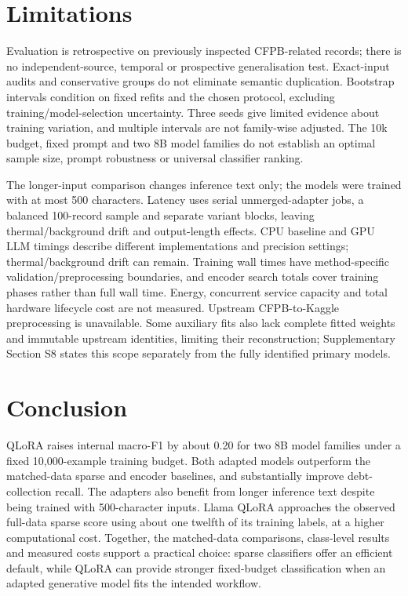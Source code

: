 \documentclass{elektr}
\begin{document}
\section{Limitations}
\label{sec:limitations}
Evaluation is retrospective on previously inspected CFPB-related records; there is no independent-source, temporal or prospective generalisation test. Exact-input audits and conservative groups do not eliminate semantic duplication. Bootstrap intervals condition on fixed refits and the chosen protocol, excluding training/model-selection uncertainty. Three seeds give limited evidence about training variation, and multiple intervals are not family-wise adjusted. The 10k budget, fixed prompt and two 8B model families do not establish an optimal sample size, prompt robustness or universal classifier ranking.

The longer-input comparison changes inference text only; the models were trained with at most 500 characters. Latency uses serial unmerged-adapter jobs, a balanced 100-record sample and separate variant blocks, leaving thermal/background drift and output-length effects. CPU baseline and GPU LLM timings describe different implementations and precision settings; thermal/background drift can remain. Training wall times have method-specific validation/preprocessing boundaries, and encoder search totals cover training phases rather than full wall time. Energy, concurrent service capacity and total hardware lifecycle cost are not measured. Upstream CFPB-to-Kaggle preprocessing is unavailable. Some auxiliary fits also lack complete fitted weights and immutable upstream identities, limiting their reconstruction; Supplementary Section S8 states this scope separately from the fully identified primary models.

\section{Conclusion}
\label{sec:conclusion}
QLoRA raises internal macro-F1 by about 0.20 for two 8B model families under a fixed 10,000-example training budget. Both adapted models outperform the matched-data sparse and encoder baselines, and substantially improve debt-collection recall. The adapters also benefit from longer inference text despite being trained with 500-character inputs. Llama QLoRA approaches the observed full-data sparse score using about one twelfth of its training labels, at a higher computational cost. Together, the matched-data comparisons, class-level results and measured costs support a practical choice: sparse classifiers offer an efficient default, while QLoRA can provide stronger fixed-budget classification when an adapted generative model fits the intended workflow.
\end{document}
